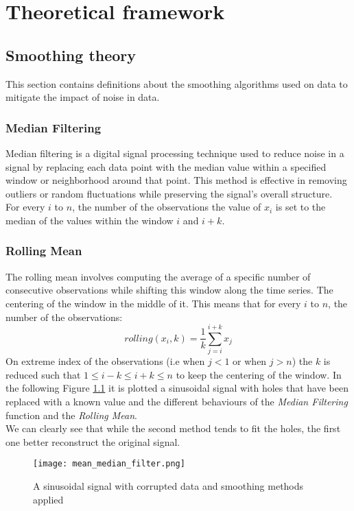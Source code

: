 \chapter{Theoretical framework}
\label{sec:theoretical_framework}

\section{Smoothing theory}
This section contains definitions about the smoothing algorithms used on data to mitigate the impact of noise in data.

\subsection{Median Filtering}
Median filtering is a digital signal processing technique used to reduce noise in a signal by replacing each data point with the median value within a specified window or neighborhood around that point. 
This method is effective in removing outliers or random fluctuations while preserving the signal's overall structure.\\
For every $i$ to $n$, the number of the observations the value of $x_i$ is set to the median of the values within the window $i$ and $i+k$.

\subsection{Rolling Mean}
The rolling mean involves computing the average of a specific number of consecutive observations while shifting this window along the time series.
The centering of the window in the middle of it.
This means that for every $i$ to $n$, the number of the observations:
\begin{equation}
  rolling(x_i,k) = \frac{1}{k} \sum_{j=i}^{i+k} x_j
  \label{eq:rolling_mean}
\end{equation}
On extreme index of the observations (i.e when $j < 1$ or when $j > n$) the $k$ is reduced such that $1 \leq i-k \leq i+k \leq n$ to keep the centering of the window.
In the following Figure \ref{fig:sin_corrupted_smoothed} it is plotted a sinusoidal signal with holes that have been replaced with a known value and the different behaviours of the \textit{Median Filtering} function and the \textit{Rolling Mean}. \\
We can clearly see that while the second method tends to fit the holes, the first one better reconstruct the original signal.
\begin{figure}[H]
  \centering  
    \texttt{[image: mean\_median\_filter.png]}
    \caption{A sinusoidal signal with corrupted data and smoothing methods applied}
    \label{fig:sin_corrupted_smoothed}
\end{figure}


